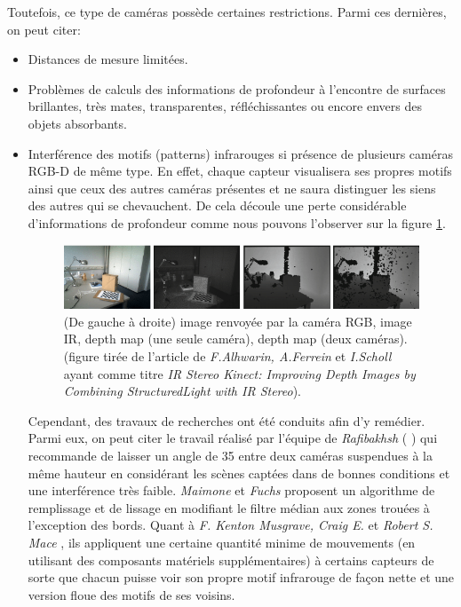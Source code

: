 \documentclass[a4paper, 12pt]{book}
\begin{document}
	\par Toutefois, ce type de caméras possède certaines restrictions. Parmi ces dernières, on peut citer:
	\begin{itemize}
		\item {Distances de mesure limitées.}	
		\item {Problèmes de calculs des informations de profondeur à l'encontre de surfaces brillantes, très mates, transparentes, réfléchissantes ou encore envers des objets absorbants.} 
		\item {Interférence des motifs (patterns) infrarouges si présence de plusieurs caméras RGB-D de même type. En effet, chaque capteur visualisera ses propres motifs ainsi que ceux des autres caméras présentes et ne saura distinguer les siens des autres qui se chevauchent.  De cela découle une perte considérable d'informations de profondeur comme nous pouvons l'observer sur la figure \ref{fig-interference}. 

\begin{figure}[H]
  \hspace{0.75cm}
 \includegraphics[scale=0.5]{images/interference.png}
  \caption{(De gauche à droite) image renvoyée par la caméra RGB, image IR, depth map (une seule caméra), depth map (deux caméras). (figure tirée de l'article de \emph{F.Alhwarin, A.Ferrein} et \emph{I.Scholl} ayant comme titre \emph{IR Stereo Kinect: Improving Depth Images by Combining StructuredLight with IR Stereo}).\label{fig-interference}}
\end{figure}

Cependant, des travaux de recherches ont été conduits afin d'y remédier. Parmi eux, on peut citer le travail réalisé par l'équipe de \emph{Rafibakhsh} ( \cite{RAFIBAKHSH15}) qui recommande de laisser un angle de 35\textdegree{} entre deux caméras suspendues à la même hauteur en considérant les scènes captées dans de bonnes conditions et une interférence très faible. \emph{Maimone} et \emph{Fuchs} \cite{MaimoneFuchs15} proposent un algorithme de remplissage et de lissage en modifiant le filtre médian aux zones trouées à l'exception des bords. Quant à \emph{F. Kenton Musgrave, Craig E.} et \emph{Robert S. Mace} \cite{KentonCraigMace12}, ils appliquent une certaine quantité minime de mouvements (en utilisant des composants matériels supplémentaires) à certains capteurs de sorte que chacun puisse voir son propre motif infrarouge de façon nette et une version floue des motifs de ses voisins. }
	\end{itemize}
\end{document}
